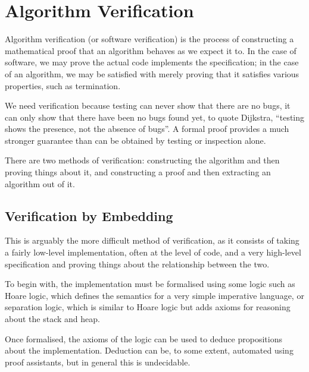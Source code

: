 \section{Algorithm Verification}
\label{sec:lit-verification}

Algorithm verification (or software verification) is the process of
constructing a mathematical proof that an algorithm behaves as we
expect it to\cite{Floyd67}. In the case of software, we may prove the
actual code implements the specification; in the case of an algorithm,
we may be satisfied with merely proving that it satisfies various
properties, such as termination.

We need verification because testing can never show that there are no
bugs, it can only show that there have been no bugs found yet, to
quote Dijkstra, ``testing shows the presence, not the absence of
bugs''\cite{Buxton70}. A formal proof provides a much stronger
guarantee than can be obtained by testing or inspection alone.

There are two methods of verification: constructing the algorithm and
then proving things about it, and constructing a proof and then
extracting an algorithm out of it.

\subsection{Verification by Embedding}
\label{sec:lit-verification-embedding}

This is arguably the more difficult method of verification, as it
consists of taking a fairly low-level implementation, often at the
level of code, and a very high-level specification and proving things
about the relationship between the two.

To begin with, the implementation must be formalised using some logic
such as Hoare logic\cite{Hoare69}, which defines the semantics for a
very simple imperative language, or separation logic\cite{Reynolds02},
which is similar to Hoare logic but adds axioms for reasoning about
the stack and heap.

Once formalised, the axioms of the logic can be used to deduce
propositions about the implementation. Deduction can be, to some
extent, automated using proof assistants, but in general this is
undecidable.

